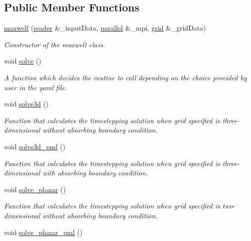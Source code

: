 \subsection*{Public Member Functions}
\begin{DoxyCompactItemize}
\item 
\hyperlink{classmaxwell_a5aa8706c755b9c5c6229a08e1aff909c}{maxwell} (\hyperlink{classreader}{reader} \&\+\_\+input\+Data, \hyperlink{classparallel}{parallel} \&\+\_\+mpi, \hyperlink{classgrid}{grid} \&\+\_\+grid\+Data)
\begin{DoxyCompactList}\small\item\em Constructor of the maxwell class. \end{DoxyCompactList}\item 
void \hyperlink{classmaxwell_a6a311a26c882fe4d67e0ad0ce54f52f5}{solve} ()
\begin{DoxyCompactList}\small\item\em A function which decides the routine to call depending on the choice provided by user in the yaml file. \end{DoxyCompactList}\item 
void \hyperlink{classmaxwell_a5374c6b5679757ff522a447891b8a821}{solve3d} ()
\begin{DoxyCompactList}\small\item\em Function that calculates the timestepping solution when grid specified is three-\/dimensional without absorbing boundary condition. \end{DoxyCompactList}\item 
void \hyperlink{classmaxwell_a03dbe6755ce725feba522949e3de67d1}{solve3d\+\_\+pml} ()
\begin{DoxyCompactList}\small\item\em Function that calculates the timestepping solution when grid specified is three-\/dimensional with absorbing boundary condition. \end{DoxyCompactList}\item 
void \hyperlink{classmaxwell_a359aefe7df563dd3fda57a91b2cd6260}{solve\+\_\+planar} ()
\begin{DoxyCompactList}\small\item\em Function that calculates the timestepping solution when grid specified is two-\/dimensional without absorbing boundary condition. \end{DoxyCompactList}\item 
void \hyperlink{classmaxwell_a09f945a8b430691775b35fdf22cdd408}{solve\+\_\+planar\+\_\+pml} ()

\end{DoxyCompactItemize}
